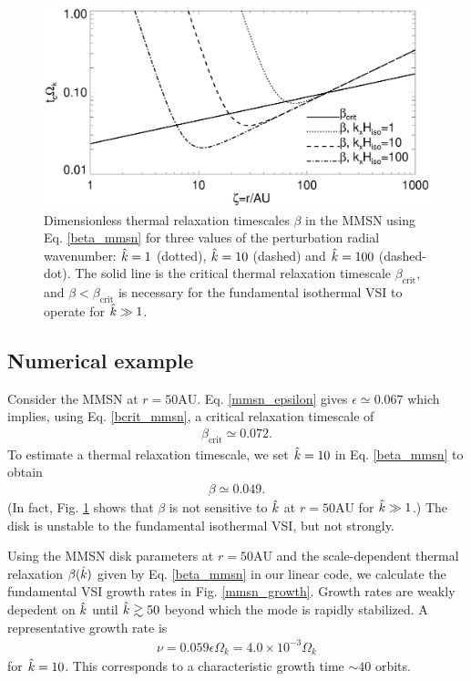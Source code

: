 \begin{figure}
  \includegraphics[width=\linewidth]{figures/bcrit_mmsn}  
  \caption{Dimensionless thermal relaxation timescales $\beta$ in the MMSN
    using Eq. \ref{beta_mmsn} for three values of the 
    perturbation radial wavenumber: $\hat{k}=1$ (dotted), $\hat{k}=10$
    (dashed) and $\hat{k}=100$ (dashed-dot). The solid line is the
    critical thermal relaxation timescale $\beta_\mathrm{crit}$, and 
    $\beta<\beta_\mathrm{crit}$
    is necessary for the fundamental isothermal VSI to operate  
    for $\hat{k}\gg1$. 
    \label{mmsn_bcrit_bcool}}   
\end{figure}  

\subsection{Numerical example}\label{mmsn_example}
Consider  the MMSN at $r=50\mathrm{AU}$. Eq. \ref{mmsn_epsilon} gives
$\epsilon \simeq 
0.067$ which implies, using Eq. \ref{bcrit_mmsn}, a critical 
relaxation timescale of  
\begin{align*}
  \beta_\mathrm{crit} \simeq 0.072. 
\end{align*} 
To estimate a thermal relaxation timescale, we set $\hat{k}=10$ 
in Eq. \ref{beta_mmsn} to obtain 
\begin{align*}
  \beta \simeq 0.049.
\end{align*}
(In fact, Fig. \ref{mmsn_bcrit_bcool} shows that $\beta$  is not
sensitive to $\hat{k}$ at $r=50\mathrm{AU}$ for $\hat{k}\gg1$.)
The disk is unstable to the fundamental isothermal VSI, but not
strongly. 

Using the MMSN disk parameters at $r=50\mathrm{AU}$ and the
scale-dependent thermal relaxation $\beta(\hat{k})$ given by
Eq. \ref{beta_mmsn} in our linear code, we calculate the fundamental
VSI growth rates in Fig. \ref{mmsn_growth}. Growth rates
are weakly depedent on $\hat{k}$ until $\hat{k}\gtrsim50$ beyond which the
mode is rapidly stabilized. A representative growth rate is 
\begin{align*}
  \nu =0.059\epsilon\Omega_k = 4.0\times10^{-3}\Omega_k 
\end{align*}
for $\hat{k}=10$. This corresponds to a characteristic growth time $\sim
40$ orbits. 


